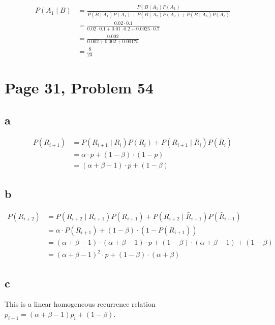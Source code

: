 \documentclass[a4paper, UTF-8]{article}
\theoremstyle{plain}
\begin{document}
\begin{align*}
P(A_1\mid B) &= \frac{P(B\mid A_1)P(A_1)}{P(B\mid A_1)P(A_1) + P(B\mid A_2)P(A_2) + P(B\mid A_3)P(A_3)}\\
             &= \frac{0.02 \cdot 0.1}{0.02 \cdot 0.1 + 0.01 \cdot 0.2 + 0.0025 \cdot 0.7}\\
             &= \frac{0.002}{0.002 + 0.002 + 0.00175} \\
             &= \frac{8}{23}
\end{align*}


\section{Page 31, Problem 54}

\subsection{a}

\begin{align*} 
P(R_{i+1}) &= P(R_{i+1}\mid R_i)P(R_i) + P(R_{i+1}\mid \bar{R}_i)P(\bar{R}_i) \\
           &= \alpha \cdot p + (1-\beta) \cdot (1-p)\\
           &= (\alpha + \beta - 1) \cdot p + (1-\beta)
\end{align*}

\subsection{b} 

\begin{align*}
P(R_{i+2}) &= P(R_{i+2}\mid R_{i+1})P(R_{i+1}) + P(R_{i+2}\mid \bar{R}_{i+1})P(\bar{R}_{i+1}) \\
           &= \alpha \cdot P(R_{i+1}) + (1-\beta) \cdot (1-P(R_{i+1})) \\
           &= (\alpha + \beta - 1) \cdot (\alpha + \beta - 1) \cdot p + (1-\beta) \cdot (\alpha + \beta - 1) + (1-\beta)\\
           &= (\alpha + \beta - 1)^2 \cdot p + (1-\beta) \cdot (\alpha + \beta)
\end{align*}

\subsection{c} 

This is a linear homogeneous recurrence relation $p_{i + 1} = (\alpha + \beta - 1)p_i + (1-\beta)$. 
\end{document}
